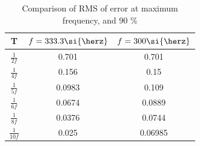 \begin{table}[h]
	\centering
	\begin{tabular}{| S | S | S |}
		\hline
		{T} & {$f= 333.3\si{\herz}$} & {$f= 300\si{\herz}$} \\
		\hline
		{$\frac{1}{2f}$} & {0.701} & {0.701} \\
		\hline
		{$\frac{1}{4f}$} & {0.156} & {0.15} \\
		\hline
		{$\frac{1}{5f}$} & {0.0983} & {0.109} \\
		\hline
		{$\frac{1}{6f}$} & {0.0674} & {0.0889} \\
		\hline
		{$\frac{1}{8f}$} & {0.0376} & {0.0744} \\
		\hline
		{$\frac{1}{10f}$} & {0.025} & {0.06985} \\
		\hline
	\end{tabular}
	\caption{Comparison of RMS of error at maximum frequency, and 90 \%}
	\label{tab:determine_maximum_frequency}
\end{table}
